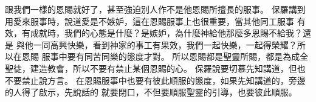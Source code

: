 跟我們一樣的恩賜就好了，甚至強迫別人作不是他恩賜所擅長的服事。
保羅講到用愛來服事時，說道愛是不嫉妒，這在恩賜服事上也很重要，當其他同工服事
有效，有成就時，我們的心態是什麼？是嫉妒，為什麼神給他那麼多恩賜不給我？還是
與他一同高興快樂，看到神家的事工有果效，我們一起快樂，一起得榮耀？所以在恩賜
服事中要有同苦同樂的態度才對。
所以恩賜都是聖靈所賜，都是為成全聖徒，建造教會，所以不要有禁止某個恩賜的心。
保羅說要切慕先知講道，但也不要禁止說方言。
在恩賜服事中也要有彼此順服的態度，如果先知講道的，旁邊的人得了啟示，先說話的
就要閉口，不但要順服聖靈的引導，也要彼此順服。
















